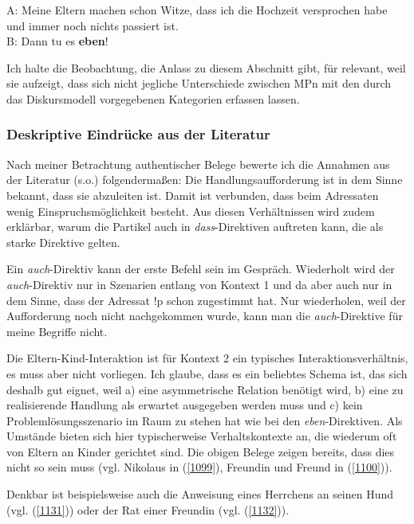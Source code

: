 {\begin{exe}
	\ex\label{1130} 
	A: Meine Eltern machen schon Witze, dass ich die Hochzeit versprochen habe und immer noch nichts passiert ist.\\
	B: Dann tu es \textbf{eben}!
\end{exe}
Ich halte die Beobachtung, die Anlass zu diesem Abschnitt gibt, für relevant, weil sie aufzeigt, dass sich nicht jegliche Unterschiede zwischen MPn mit den durch das Diskursmodell vorgegebenen Kategorien erfassen lassen.

\subsubsection{Deskriptive Eindrücke aus der Literatur}
Nach meiner Betrachtung authentischer Belege bewerte ich die Annahmen aus der Literatur (s.o.) folgendermaßen: Die Handlungsaufforderung ist in dem Sinne bekannt, dass sie abzuleiten ist. Damit ist verbunden, dass beim Adressaten wenig Einspruchsmöglichkeit besteht. Aus diesen Verhältnissen wird zudem er\-klärbar, warum die Partikel auch in \textit{dass}-Direktiven auftreten kann, die als starke Direktive gelten.

Ein \textit{auch}-Direktiv kann der erste Befehl sein im Gespräch. Wiederholt wird der \textit{auch}-Direktiv nur in Szenarien entlang von Kontext 1 und da aber auch nur in dem Sinne, dass der Adressat !p schon zugestimmt hat. Nur wiederholen, weil der Aufforderung noch nicht nachgekommen wurde, kann man die \textit{auch}-Direktive für meine Begriffe nicht.

Die Eltern-Kind-Interaktion ist für Kontext 2 ein typisches Interaktionsverhältnis, es muss aber nicht vorliegen. Ich glaube, dass es ein beliebtes Schema ist, das sich deshalb gut eignet, weil a) eine asymmetrische Relation benötigt wird, b) eine zu realisierende Handlung als erwartet ausgegeben werden muss und c) kein Problemlösungsszenario im Raum zu stehen hat wie bei den \textit{eben}-Direktiven. Als Umstände bieten sich hier typischerweise Verhaltskontexte an, die wiederum oft von Eltern an Kinder gerichtet sind. Die obigen Belege zeigen bereits, dass dies nicht so sein muss (vgl. Nikolaus in (\ref{1099}), Freundin und Freund in (\ref{1100})).
 							 
Denkbar ist beispielsweise auch die Anweisung eines Herrchens an seinen Hund (vgl. (\ref{1131})) oder der Rat einer Freundin (vgl. (\ref{1132})).
	
}
